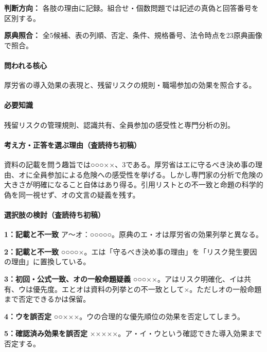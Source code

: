 \noindent\textbf{判断方向：} 各肢の理由に記録。組合せ・個数問題では記述の真偽と回答番号を区別する。\par

\noindent\textbf{原典照合：} 全5候補、表の列順、否定、条件、規格番号、法令時点を23原典画像で照合。\par

\paragraph{問われる核心} 厚労省の導入効果の表現と、残留リスクの規則・職場参加の効果を照合する。

\paragraph{必要知識} 残留リスクの管理規則、認識共有、全員参加の感受性と専門分析の別。

\paragraph{考え方・正答を選ぶ理由（査読待ち初稿）} 資料の記載を問う趣旨では○○○××、3である。厚労省はエに守るべき決め事の理由、オに全員参加による危険への感受性を挙げる。しかし専門家の分析で危険の大きさが明確になること自体はあり得る。引用リストとの不一致と命題の科学的偽を同一視せず、オの文言の疑義を残す。

\paragraph{選択肢の検討（査読待ち初稿）}\mbox{}\par

\noindent\textbf{1：記載と不一致} ア〜オ：○○○○○。原典のエ・オは厚労省の効果列挙と異なる。\par

\noindent\textbf{2：記載と不一致} ○○○○×。エは「守るべき決め事の理由」を「リスク発生要因の理由」に置換している。\par

\noindent\textbf{3：初回・公式一致、オの一般命題疑義} ○○○××。アはリスク明確化、イは共有、ウは優先度。エとオは資料の列挙との不一致として×。ただしオの一般命題まで否定できるかは保留。\par

\noindent\textbf{4：ウを誤否定} ○○×××。ウの合理的な優先順位の効果を否定してしまう。\par

\noindent\textbf{5：確認済み効果を誤否定} ×××××。ア・イ・ウという確認できた導入効果まで否定する。\par

